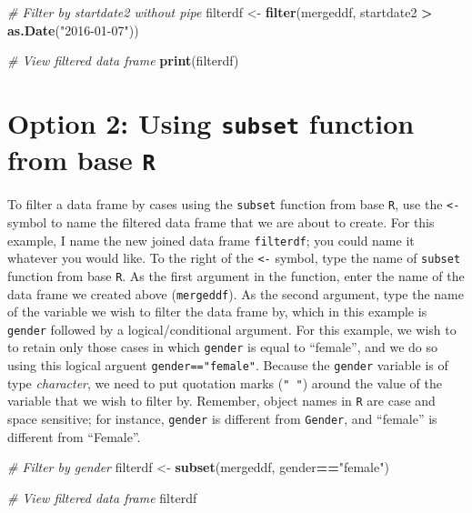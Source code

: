 \documentclass[]{book}
\newenvironment{Shaded}{\begin{snugshade}}{\end{snugshade}}
\newcommand{\KeywordTok}[1]{\textcolor[rgb]{0.13,0.29,0.53}{\textbf{#1}}}
\newcommand{\StringTok}[1]{\textcolor[rgb]{0.31,0.60,0.02}{#1}}
\newcommand{\CommentTok}[1]{\textcolor[rgb]{0.56,0.35,0.01}{\textit{#1}}}
\newcommand{\OperatorTok}[1]{\textcolor[rgb]{0.81,0.36,0.00}{\textbf{#1}}}
\newcommand{\NormalTok}[1]{#1}
\begin{document}
\begin{Shaded}
\begin{Highlighting}[]
\CommentTok{# Filter by startdate2 without pipe}
\NormalTok{filterdf <-}\StringTok{ }\KeywordTok{filter}\NormalTok{(mergeddf, startdate2 }\OperatorTok{>}\StringTok{ }\KeywordTok{as.Date}\NormalTok{(}\StringTok{"2016-01-07"}\NormalTok{))}

\CommentTok{# View filtered data frame}
\KeywordTok{print}\NormalTok{(filterdf)}
\end{Highlighting}
\end{Shaded}

\section{\texorpdfstring{Option 2: Using \texttt{subset} function from
base
\texttt{R}}{Option 2: Using subset function from base R}}\label{option-2-using-subset-function-from-base-r}

To filter a data frame by cases using the \texttt{subset} function from
base \texttt{R}, use the \texttt{\textless{}-} symbol to name the
filtered data frame that we are about to create. For this example, I
name the new joined data frame \texttt{filterdf}; you could name it
whatever you would like. To the right of the \texttt{\textless{}-}
symbol, type the name of \texttt{subset} function from base \texttt{R}.
As the first argument in the function, enter the name of the data frame
we created above (\texttt{mergeddf}). As the second argument, type the
name of the variable we wish to filter the data frame by, which in this
example is \texttt{gender} followed by a logical/conditional argument.
For this example, we wish to to retain only those cases in which
\texttt{gender} is equal to ``female'', and we do so using this logical
arguent \texttt{gender=="female"}. Because the \texttt{gender} variable
is of type \emph{character}, we need to put quotation marks
(\texttt{"\ "}) around the value of the variable that we wish to filter
by. Remember, object names in \texttt{R} are case and space sensitive;
for instance, \texttt{gender} is different from \texttt{Gender}, and
``female'' is different from ``Female''.

\begin{Shaded}
\begin{Highlighting}[]
\CommentTok{# Filter by gender}
\NormalTok{filterdf <-}\StringTok{ }\KeywordTok{subset}\NormalTok{(mergeddf, gender}\OperatorTok{==}\StringTok{"female"}\NormalTok{)}

\CommentTok{# View filtered data frame}
\NormalTok{filterdf}
\end{Highlighting}
\end{Shaded}
\end{document}
